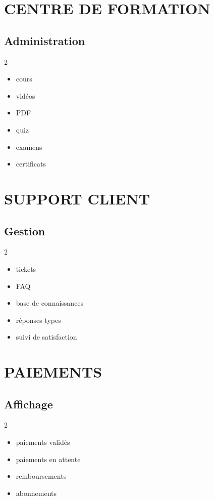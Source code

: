 \documentclass[12pt,a4paper,oneside]{book}
\begin{document}
\chapter{CENTRE DE FORMATION}

\section{Administration}
\begin{multicols}{2}
\begin{itemize}
\item cours
\item vidéos
\item PDF
\item quiz
\item examens
\item certificats
\end{itemize}
\end{multicols}

\chapter{SUPPORT CLIENT}

\section{Gestion}
\begin{multicols}{2}
\begin{itemize}
\item tickets
\item FAQ
\item base de connaissances
\item réponses types
\item suivi de satisfaction
\end{itemize}
\end{multicols}

\chapter{PAIEMENTS}

\section{Affichage}
\begin{multicols}{2}
\begin{itemize}
\item paiements validés
\item paiements en attente
\item remboursements
\item abonnements
\end{itemize}
\end{multicols}
\end{document}
